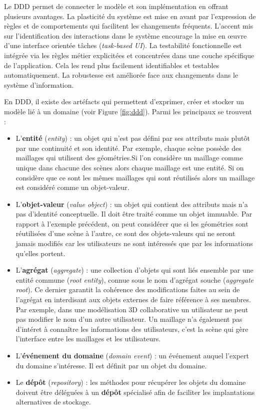 Le \gls{DDD} permet de connecter le modèle et son implémentation en offrant 
plusieurs avantages. La plasticité du système est mise en avant par l'expression 
de règles et de comportements qui facilitent les changements fréquents.
L'accent mis sur l'identification des interactions dans le système encourage la 
mise en \oe{}uvre d'une interface orientée tâches (\textit{task-based UI}).
La testabilité fonctionnelle est intégrée via les règles métier explicitées 
et concentrées dans une couche spécifique de l'application. Cela les rend 
plus facilement identifiables et testables automatiquement.
La robustesse est améliorée face aux changements dans le système d'information.

En \gls{DDD}, il existe des artéfacts qui permettent d'exprimer, créer et stocker un 
modèle lié à un domaine (voir Figure \ref{fig:ddd}). Parmi les principaux se trouvent 
:
\begin{itemize}
	\item L'\textbf{entité} (\textit{entity}) : un objet qui n'est pas défini par ses 
	attributs 
	mais plutôt par une continuité et son identité. 
	Par exemple, chaque scène possède des maillages qui utilisent des 
	géométries.Si l'on 
	considère un maillage comme unique dans chacune des scènes alors chaque 
	maillage est une entité. Si on considère que ce sont les mêmes maillages qui 
	sont réutilisés alors un maillage est considéré comme un objet-valeur.
	
	\item L'\textbf{objet-valeur} (\textit{value object}) : un objet qui contient des 
	attributs 
	mais n'a pas d'identité conceptuelle. Il doit être traité comme un objet
	immuable. Par rapport à l'exemple précédent, on peut considérer que si les 
	géométries sont réutilisées d'une scène à l'autre, ce sont des objets-valeurs qui 
	ne seront jamais modifiés car les utilisateurs ne sont intéressés que par les 
	informations qu'elles portent.
	
	\item L'\textbf{agrégat} (\textit{aggregate}) : une collection d'objets qui sont 
	liés 
	ensemble par une entité commune (\textit{root entity}), connue sous le nom 
	d'agrégat souche (\textit{aggregate root}). Ce dernier garantit la cohérence des 
	modifications faites au sein de l'agrégat en interdisant aux objets externes de 
	faire référence à ses membres. Par exemple, dans une modélisation \gls{3D} 
	collaborative un utilisateur ne peut pas modifier le nom d'un autre utilisateur. Un 
	maillage n'a également pas d'intéret à connaître les informations des 
	utilisateurs, c'est la scène qui gère l'interface entre les maillages et les 
	utilisateurs.
	\item L'\textbf{événement du domaine} (\textit{domain event}) : un 
	événement auquel 
	l'expert du domaine s'intéresse. Il est définit par un objet du domaine.
	\item Le \textbf{dépôt} (\textit{repository}) : les méthodes pour récupérer les 
	objets du domaine doivent être déléguées à un \textbf{dépôt} spécialisé afin de 
	faciliter les implantations 
	alternatives de stockage.
\end{itemize}



